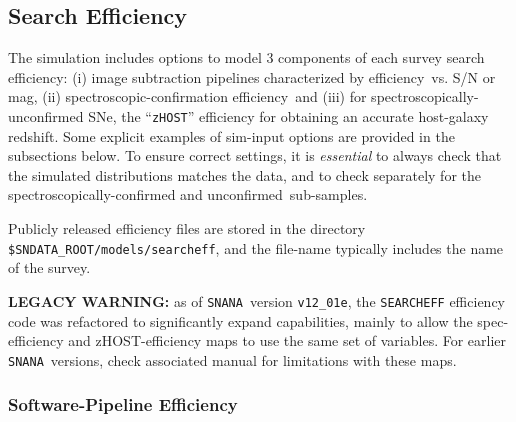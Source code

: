 \documentclass[12pt]{article}
\newcommand{\SNANA}{{\tt SNANA}}
\newcommand{\eff}{efficiency}
\newcommand{\spec}{spectroscopic}
\newcommand{\specy}{spectroscopically}
\begin{document}
{%
   \clearpage
   \subsection{Search Efficiency }
   \label{subsec:simeff}

\newcommand{\nospec}{unconfirmed}
\newcommand{\Nospec}{Unconfirmed}

The simulation includes options to model 3 components of each survey 
search \eff:
(i) image subtraction pipelines characterized by \eff\ vs. S/N or mag,
(ii) \spec-confirmation \eff\ and 
(iii) for {\specy}-{\nospec} SNe, the ``{\tt zHOST}'' efficiency 
for obtaining an accurate host-galaxy redshift.
%
Some explicit examples of sim-input options are provided in the
subsections below.
To ensure correct settings, it is {\em essential} to always check that the
simulated distributions matches the data, and to check separately for the
\specy-confirmed and \nospec\ sub-samples.


Publicly released efficiency files are stored in the directory  
\verb|$SNDATA_ROOT/models/searcheff|,
and the file-name typically includes the name of the survey.

{\bf LEGACY WARNING:} as of \SNANA\ version \verb|v12_01e|,
the {\tt SEARCHEFF} efficiency code was refactored to significantly
expand capabilities, mainly to allow the spec-efficiency and
zHOST-efficiency maps to use the same set of variables.
For earlier \SNANA\ versions, check associated manual for limitations
with these maps.

\subsubsection{Software-Pipeline Efficiency }
\label{sss:eff_pipeline}

}
\end{document}
